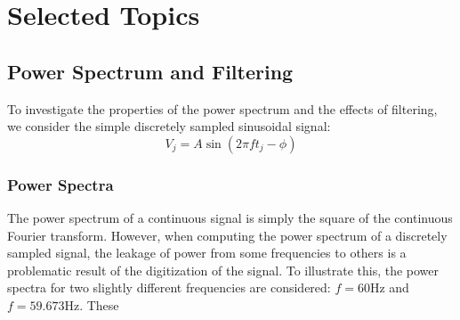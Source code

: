 \message{ !name(austin_report.tex)}\documentclass[11pt, letterpage, twocolumn]{article}
\begin{document}


\section{Selected Topics}
\subsection{Power Spectrum and Filtering}
To investigate the properties of the power spectrum and the effects of
filtering, we consider the simple discretely sampled sinusoidal signal:
\begin{equation}
  V_j = A \sin(2 \pi f t_j - \phi)
  \label{eq:sine}
\end{equation}


\subsubsection{Power Spectra}
The power spectrum of a continuous signal is simply the square of the continuous
Fourier transform. However, when computing the power spectrum of a discretely
sampled signal, the leakage of power from some frequencies to others is a
problematic result of the digitization of the signal. To illustrate this, the
power spectra for two slightly different frequencies are considered: $f = 60$Hz
and $f = 59.673$Hz. These 
\end{document}
